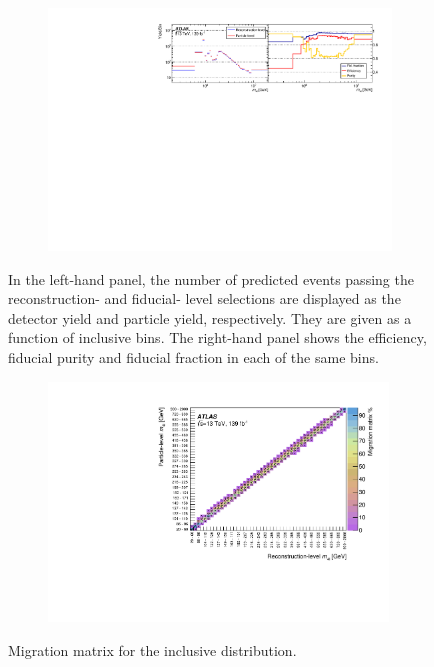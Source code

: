\begin{figure}[tbh!]
    \begin{subfigure}{.99\textwidth}\centering
      \includegraphics[width=.99\linewidth]{Figures/m4l/UnfoldingStudies/v014_inputs/inclm4linputs.pdf}  
    \end{subfigure}
    \caption{In the left-hand panel, the number of predicted events passing the reconstruction- and fiducial- level selections are displayed as the detector yield and particle yield, respectively. They are given as a function of inclusive \mFourL{} bins. The right-hand panel shows the efficiency, fiducial purity and fiducial fraction in each of the same \mFourL{} bins.}
    \label{fig:inclm4lunf}
\end{figure}
\begin{figure}[tbh!]
  \centering
  \begin{subfigure}{.99\textwidth}\centering\includegraphics[width = 0.99\textwidth]{Figures/m4l/UnfoldingStudies/v014_matrices/inclm4lMatrix.pdf}\end{subfigure}
 \caption{Migration matrix for the inclusive \mFourL{} distribution. \label{fig:inclm4lmat}}
\end{figure}
